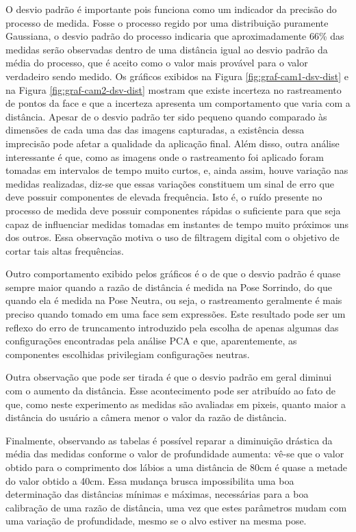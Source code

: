 O desvio padrão é importante pois funciona como um indicador da precisão do processo de medida. Fosse o processo regido por uma distribuição puramente Gaussiana, o desvio padrão do processo indicaria que aproximadamente 66\% das medidas serão observadas dentro de uma distância igual ao desvio padrão da média do processo, que é aceito como o valor mais provável para o valor verdadeiro sendo medido.  Os gráficos exibidos na Figura \ref{fig:graf-cam1-dsv-dist} e na Figura \ref{fig:graf-cam2-dsv-dist} mostram que existe incerteza no rastreamento de pontos da face e que a incerteza apresenta um comportamento que varia com a distância. Apesar de o desvio padrão ter sido pequeno quando comparado às dimensões de cada uma das das imagens capturadas, a existência dessa imprecisão pode afetar a qualidade da aplicação final. Além disso, outra análise interessante é que, como as imagens onde o rastreamento foi aplicado foram tomadas em intervalos de tempo muito curtos, e, ainda assim, houve variação nas medidas realizadas, diz-se que essas variações constituem um sinal de erro que deve possuir componentes de elevada frequência. Isto é, o ruído presente no processo de medida deve possuir componentes rápidas o suficiente para que seja capaz de influenciar medidas tomadas em instantes de tempo muito próximos uns dos outros. Essa observação motiva o uso de filtragem digital com o objetivo de cortar tais altas frequências.

Outro comportamento exibido pelos gráficos é o de que o desvio padrão é quase sempre maior quando a razão de distância é medida na Pose Sorrindo, do que quando ela é medida na Pose Neutra, ou seja, o rastreamento geralmente é mais preciso quando tomado em uma face sem expressões.  Este resultado pode ser um reflexo do erro de truncamento introduzido pela escolha de apenas algumas das configurações encontradas pela análise PCA e que, aparentemente, as componentes escolhidas privilegiam configurações neutras.

Outra observação que pode ser tirada é que o desvio padrão em geral diminui com o aumento da distância. Esse acontecimento pode ser atribuído ao fato de que, como neste experimento as medidas são avaliadas em pixeis, quanto maior a distância do usuário a câmera menor o valor da razão de distância.

Finalmente, observando as tabelas é possível reparar a diminuição drástica da média das medidas conforme o valor de profundidade aumenta: vê-se que o valor obtido para o comprimento dos lábios a uma distância de 80cm é quase a metade do valor obtido a 40cm.  Essa mudança brusca impossibilita uma boa determinação das distâncias mínimas e máximas, necessárias para a boa calibração de uma razão de distância, uma vez que estes parâmetros mudam com uma variação de profundidade, mesmo se o alvo estiver na mesma pose.


